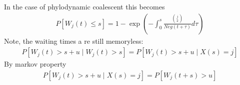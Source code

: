 \documentclass{report}
\theoremstyle{definition}
\begin{document}
In the case of phylodynamic coalescent this becomes
\begin{gather}
P[W_j(t) \leq s] = 1 - \exp(-\int_0^{s}\frac{\binom{j}{2}}{Neg(t+\tau)}d\tau)
\end{gather}
\newpage
Note, the waiting times a
re still memoryless:
\begin{gather}
P\left[W_j(t) > s+u\mid W_j(t)>s \right] = P\left[W_j(t) > s+u\mid X(s)=j\right]
\end{gather}
By markov property
\begin{gather}
P\left[W_j(t) > s+u\mid X(s)=j\right] = P\left[W_j(t+s) > u\right]
\end{gather}
\end{document}
